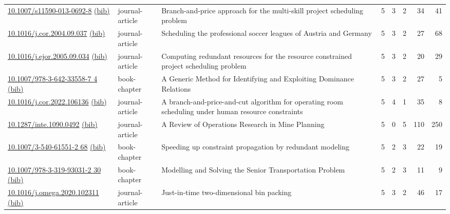 {\begin{longtable}{p{5cm}lp{11cm}rrrrr}
\href{http://dx.doi.org/10.1007/s11590-013-0692-8}{10.1007/s11590-013-0692-8} \href{https://www.doi2bib.org/bib/10.1007/s11590-013-0692-8}{(bib)} & journal-article & Branch-and-price approach for the multi-skill project scheduling problem & 5 & 3 & 2 & 34 & 41 \\
\href{http://dx.doi.org/10.1016/j.cor.2004.09.037}{10.1016/j.cor.2004.09.037} \href{https://www.doi2bib.org/bib/10.1016/j.cor.2004.09.037}{(bib)} & journal-article & Scheduling the professional soccer leagues of Austria and Germany & 5 & 3 & 2 & 27 & 68 \\
\href{http://dx.doi.org/10.1016/j.ejor.2005.09.034}{10.1016/j.ejor.2005.09.034} \href{https://www.doi2bib.org/bib/10.1016/j.ejor.2005.09.034}{(bib)} & journal-article & Computing redundant resources for the resource constrained project scheduling problem & 5 & 3 & 2 & 20 & 29 \\
\href{http://dx.doi.org/10.1007/978-3-642-33558-7_4}{10.1007/978-3-642-33558-7 4} \href{https://www.doi2bib.org/bib/10.1007/978-3-642-33558-7_4}{(bib)} & book-chapter & A Generic Method for Identifying and Exploiting Dominance Relations & 5 & 3 & 2 & 27 & 5 \\
\href{http://dx.doi.org/10.1016/j.cor.2022.106136}{10.1016/j.cor.2022.106136} \href{https://www.doi2bib.org/bib/10.1016/j.cor.2022.106136}{(bib)} & journal-article & A branch-and-price-and-cut algorithm for operating room scheduling under human resource constraints & 5 & 4 & 1 & 35 & 8 \\
\href{http://dx.doi.org/10.1287/inte.1090.0492}{10.1287/inte.1090.0492} \href{https://www.doi2bib.org/bib/10.1287/inte.1090.0492}{(bib)} & journal-article & A Review of Operations Research in Mine Planning & 5 & 0 & 5 & 110 & 250 \\
\href{http://dx.doi.org/10.1007/3-540-61551-2_68}{10.1007/3-540-61551-2 68} \href{https://www.doi2bib.org/bib/10.1007/3-540-61551-2_68}{(bib)} & book-chapter & Speeding up constraint propagation by redundant modeling & 5 & 2 & 3 & 22 & 19 \\
\href{http://dx.doi.org/10.1007/978-3-319-93031-2_30}{10.1007/978-3-319-93031-2 30} \href{https://www.doi2bib.org/bib/10.1007/978-3-319-93031-2_30}{(bib)} & book-chapter & Modelling and Solving the Senior Transportation Problem & 5 & 2 & 3 & 11 & 9 \\
\href{http://dx.doi.org/10.1016/j.omega.2020.102311}{10.1016/j.omega.2020.102311} \href{https://www.doi2bib.org/bib/10.1016/j.omega.2020.102311}{(bib)} & journal-article & Just-in-time two-dimensional bin packing & 5 & 3 & 2 & 46 & 17 \\

\end{longtable}}
